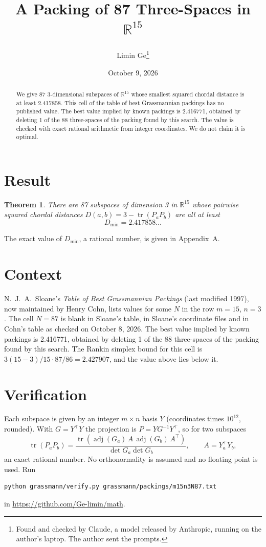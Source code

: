 \documentclass[11pt,a4paper]{article}
\title{A Packing of 87 Three-Spaces in $\mathbb{R}^{15}$}
\author{Limin Ge\thanks{Found and checked by Claude, a model released by Anthropic, running on the author's laptop. The author sent the prompts.}}
\date{October 9, 2026}
\newtheorem*{theorem}{Theorem}
\begin{document}
\maketitle
\begin{abstract}
We give 87 3-dimensional subspaces of $\mathbb{R}^{15}$ whose smallest squared chordal distance is at least 2.417858. This cell of the table of best Grassmannian packings has no published value. The best value implied by known packings is 2.416771, obtained by deleting 1 of the 88 three-spaces of the packing found by this search. The value is checked with exact rational arithmetic from integer coordinates. We do not claim it is optimal.
\end{abstract}

\section{Result}
\begin{theorem}
There are 87 subspaces of dimension 3 in $\mathbb{R}^{15}$ whose pairwise squared chordal distances $D(a,b) = 3 - \operatorname{tr}(P_aP_b)$ are all at least
\[ D_{\min} = 2.417858\ldots \]
\end{theorem}
The exact value of $D_{\min}$, a rational number, is given in Appendix~A.


\section{Context}
N.~J.~A.~Sloane's \emph{Table of Best Grassmannian Packings} (last modified 1997), now maintained by Henry Cohn, lists values for some $N$ in the row $m=15$, $n=3$. The cell $N=87$ is blank in Sloane's table, in Sloane's coordinate files and in Cohn's table as checked on October 8, 2026. The best value implied by known packings is 2.416771, obtained by deleting 1 of the 88 three-spaces of the packing found by this search. The Rankin simplex bound for this cell is $3(15-3)/15\cdot 87/86 = 2.427907$, and the value above lies below it.


\section{Verification}
Each subspace is given by an integer $m\times n$ basis $Y$ (coordinates times $10^{12}$, rounded). With $G=Y^\top Y$ the projection is $P=YG^{-1}Y^\top$, so for two subspaces
\[ \operatorname{tr}(P_aP_b)=\frac{\operatorname{tr}(\operatorname{adj}(G_a)\,A\,\operatorname{adj}(G_b)\,A^\top)}{\det G_a\det G_b},\qquad A=Y_a^\top Y_b, \]
an exact rational number. No orthonormality is assumed and no floating point is used. Run
\begin{verbatim}
python grassmann/verify.py grassmann/packings/m15n3N87.txt
\end{verbatim}
in \url{https://github.com/Ge-limin/math}.
\end{document}
